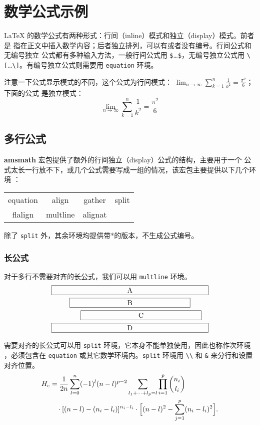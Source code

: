 \section{数学公式示例}
\label{sec:equation}

\LaTeX{} 的数学公式有两种形式：行间（inline）模式和独立（display）模式。前者是
指在正文中插入数学内容；后者独立排列，可以有或者没有编号。行间公式和无编号独立
公式都有多种输入方法，一般行间公式用 \verb|$|\ldots \verb|$|，无编号独立公式用
\verb|\[|\ldots \verb|\]|。有编号独立公式则需要用 \texttt{equation} 环境。

注意一下公式显示模式的不同，这个公式为行间模式：
$\lim_{n \to \infty} \sum_{k=1}^n \frac{1}{k^2} = \frac{\pi^2}{6}$；下面的公式
是独立模式：
\[\lim_{n \to \infty} \sum_{k=1}^n \frac{1}{k^2} = \frac{\pi^2}{6}\]

\subsection{多行公式}

\textbf{amsmath} 宏包提供了额外的行间独立（display）公式的结构，主要用于一个
公式太长一行放不下，或几个公式需要写成一组的情况，该宏包主要提供以下几个环境
：
\begin{center}
\begin{tabular}[c]{cccc}
equation & align & gather & split \\
flalign & multline & alignat &  \\
\end{tabular}
\end{center}

除了 \texttt{split} 外，其余环境均提供带*的版本，不生成公式编号。

\subsubsection{长公式}

对于多行不需要对齐的长公式，我们可以用 \texttt{multline} 环境。
\begin{multline}
\framebox[.65\columnwidth]{A}\\
\framebox[.5\columnwidth]{B}\\
\shoveright{\framebox[.5\columnwidth]{C}}\\
\framebox[.65\columnwidth]{D}
\end{multline}

需要对齐的长公式可以用 \texttt{split} 环境，它本身不能单独使用，因此也称作次环境
，必须包含在 \texttt{equation} 或其它数学环境内。\texttt{split} 环境用 \verb|\\| 
和 \verb|&| 来分行和设置对齐位置。
\begin{equation}
\begin{split}
H_c&=\frac{1}{2n} \sum^n_{l=0}(-1)^{l}(n-{l})^{p-2}
\sum_{l _1+\dots+ l _p=l}\prod^p_{i=1} \binom{n_i}{l _i}\\
&\quad\cdot[(n-l)-(n_i-l_i)]^{n_i-l_i}\cdot
\Bigl[(n-l)^2-\sum^p_{j=1}(n_i-l_i)^2\Bigr].
\end{split}
\label{eqn:barwq}
\end{equation}

